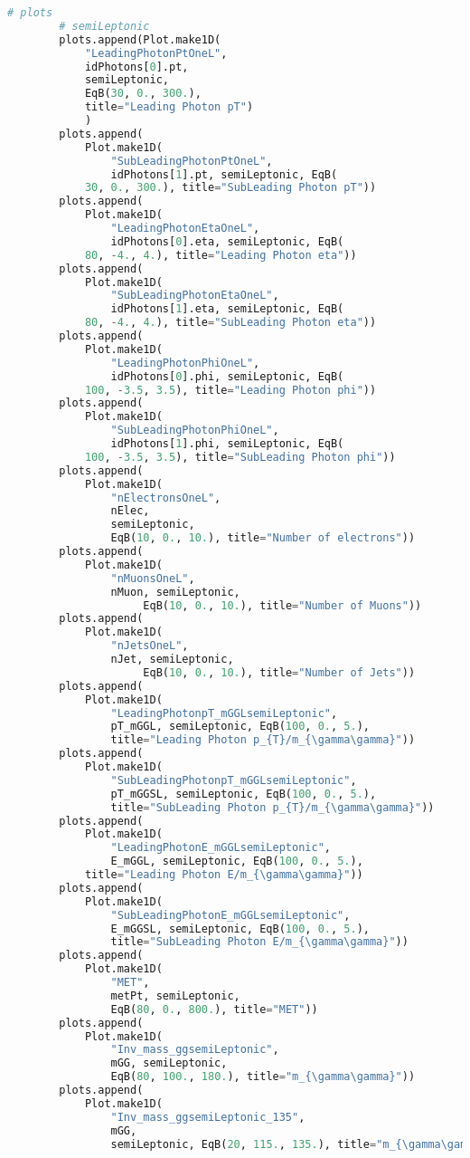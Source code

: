 \begin{lstlisting}[language=Python, caption=Python module of the analysis used in Bamboo framework, label={bamboocode}]
        # plots
        # semiLeptonic
        plots.append(Plot.make1D(
            "LeadingPhotonPtOneL",
            idPhotons[0].pt,
            semiLeptonic,
            EqB(30, 0., 300.),
            title="Leading Photon pT")
            )
        plots.append(
            Plot.make1D(
                "SubLeadingPhotonPtOneL",
                idPhotons[1].pt, semiLeptonic, EqB(
            30, 0., 300.), title="SubLeading Photon pT"))
        plots.append(
            Plot.make1D(
                "LeadingPhotonEtaOneL",
                idPhotons[0].eta, semiLeptonic, EqB(
            80, -4., 4.), title="Leading Photon eta"))
        plots.append(
            Plot.make1D(
                "SubLeadingPhotonEtaOneL",
                idPhotons[1].eta, semiLeptonic, EqB(
            80, -4., 4.), title="SubLeading Photon eta"))
        plots.append(
            Plot.make1D(
                "LeadingPhotonPhiOneL",
                idPhotons[0].phi, semiLeptonic, EqB(
            100, -3.5, 3.5), title="Leading Photon phi"))
        plots.append(
            Plot.make1D(
                "SubLeadingPhotonPhiOneL",
                idPhotons[1].phi, semiLeptonic, EqB(
            100, -3.5, 3.5), title="SubLeading Photon phi"))
        plots.append(
            Plot.make1D(
                "nElectronsOneL",
                nElec,
                semiLeptonic,
                EqB(10, 0., 10.), title="Number of electrons"))
        plots.append(
            Plot.make1D(
                "nMuonsOneL",
                nMuon, semiLeptonic,
                     EqB(10, 0., 10.), title="Number of Muons"))
        plots.append(
            Plot.make1D(
                "nJetsOneL",
                nJet, semiLeptonic,
                     EqB(10, 0., 10.), title="Number of Jets"))
        plots.append(
            Plot.make1D(
                "LeadingPhotonpT_mGGLsemiLeptonic",
                pT_mGGL, semiLeptonic, EqB(100, 0., 5.),
                title="Leading Photon p_{T}/m_{\gamma\gamma}"))
        plots.append(
            Plot.make1D(
                "SubLeadingPhotonpT_mGGLsemiLeptonic",
                pT_mGGSL, semiLeptonic, EqB(100, 0., 5.),
                title="SubLeading Photon p_{T}/m_{\gamma\gamma}"))
        plots.append(
            Plot.make1D(
                "LeadingPhotonE_mGGLsemiLeptonic",
                E_mGGL, semiLeptonic, EqB(100, 0., 5.),
            title="Leading Photon E/m_{\gamma\gamma}"))
        plots.append(
            Plot.make1D(
                "SubLeadingPhotonE_mGGLsemiLeptonic",
                E_mGGSL, semiLeptonic, EqB(100, 0., 5.),
                title="SubLeading Photon E/m_{\gamma\gamma}"))
        plots.append(
            Plot.make1D(
                "MET",
                metPt, semiLeptonic,
                EqB(80, 0., 800.), title="MET"))
        plots.append(
            Plot.make1D(
                "Inv_mass_ggsemiLeptonic",
                mGG, semiLeptonic,
                EqB(80, 100., 180.), title="m_{\gamma\gamma}"))
        plots.append(
            Plot.make1D(
                "Inv_mass_ggsemiLeptonic_135",
                mGG,
                semiLeptonic, EqB(20, 115., 135.), title="m_{\gamma\gamma}"))


\end{lstlisting}
